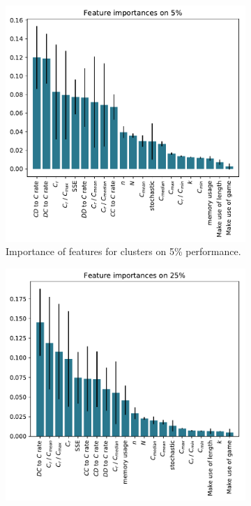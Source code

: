 \documentclass{article}
\begin{document}
\begin{figure}[!htbp]
    \begin{subfigure}[t]{0.5\textwidth}
        \begin{center}
            \includegraphics[width=.75\linewidth]{../new_output/standard/_feature_importance_bar_plot_cluster_on_0_05.pdf}
        \end{center}
        \caption{Importance of features for clusters on 5\% performance.}
    \end{subfigure}\hfill
    \begin{subfigure}[t]{0.5\textwidth}
        \begin{center}
            \includegraphics[width=.75\linewidth]{../new_output/standard/_feature_importance_bar_plot_cluster_on_0_25.pdf}

\end{center}
\end{subfigure}
\end{figure}
\end{document}
